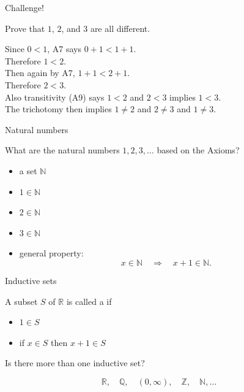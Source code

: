 \documentclass{beamer}
\begin{document}
\begin{frame}{Challenge!}
\begin{prob}
Prove that $1$, $2$, and $3$ are all different.
\end{prob}
\pause
\begin{soln}
\pause
Since $0 < 1$, A7 says $0+1 < 1+1$.\\
\pause
Therefore $1<2$.\\
\pause
Then again by A7, $1+1 < 2+1$.\\
\pause
Therefore $2<3$.\\
\pause
Also transitivity (A9) says $1 < 2$ and $2 < 3$ implies $1 < 3$.\\
\pause
The trichotomy then implies $1\neq 2$ and $2\neq 3$ and $1\neq 3$.
\end{soln}
\end{frame}

\begin{frame}{Natural numbers}
\begin{quest}
What are the natural numbers $1,2,3,\dots$ based on the Axioms?
\end{quest}
\begin{defn}
\begin{itemize}
\pause
\item a set $\mathbb N$
\pause
\item $1\in \mathbb N$
\pause
\item $2\in \mathbb N$
\pause
\item $3\in \mathbb N$
\pause
\item general property:
$$x\in \mathbb N\quad\Longrightarrow\quad x+1\in \mathbb N.$$
\end{itemize}
\end{defn}
\end{frame}

\begin{frame}{Inductive sets}
\begin{defn}
A subset $S$ of $\mathbb{R}$ is called a  if
\begin{itemize}
\pause
\item $1\in S$
\pause
\item if $x\in S$ then $x+1\in S$ 
\end{itemize}
\end{defn}
\pause
\begin{quest}
Is there more than one inductive set?
\end{quest}
\pause
$$\mathbb{R},\quad\mathbb{Q},\quad(0,\infty),\quad\mathbb{Z},\quad\mathbb{N},\dots$$
\end{frame}
\end{document}

